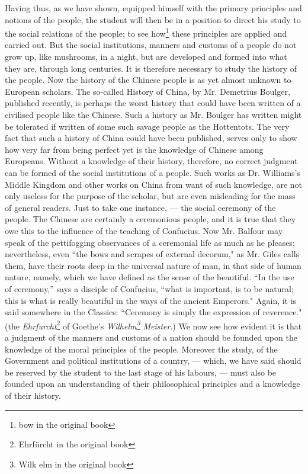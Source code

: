 Having thus, as we have shown, equipped himself with the primary principles and notions of the people, the student will then be in a position to direct his study to the social relations of the people; to see how\footnote{bow in the original book} these principles are applied and carried out. 
But the social institutions, manners and customs of a people do not grow up, like mushrooms, in a night, but are developed and formed into what they are, through long centuries.
It is therefore necessary to study the history of the people.
Now the history of the Chinese people is as yet almost unknown to European scholars.
The so-called History of China, by Mr. Demetrius Boulger, published recently, is perhaps the worst history that could have been written of a civilised people like the Chinese.
Such a history as Mr. Boulger has written might be tolerated if written of some such savage people as the Hottentots.
The very fact that such a history of China could have been published, serves only to show how very far from being perfect yet is the knowledge of Chinese among Europeans.
Without a knowledge of their history, therefore, no correct judgment can be formed of the social institutions of a people.
Such works as Dr. Williams's Middle Kingdom and other works on China from want of such knowledge, are not only useless for the purpose of the scholar, but are even misleading for the mass of general readers.
Just to take one instance, --- the social ceremony of the people.
The Chinese are certainly a ceremonious people, and it is true that they owe this to the influence of the teaching of Confucius.
Now Mr. Balfour may speak of the pettifogging observances of a ceremonial life as much as he pleases; nevertheless, even ``the bows and scrapes of external decorum," as Mr. Giles calls them, have their roots deep in the universal nature of man, in that side of human nature, namely, which we have defined as the sense of the beautiful.
``In the use of ceremony,'' says a disciple of Confucius, ``what is important, is to be natural; this is what is really beautiful in the ways of the ancient Emperors."
Again, it is said somewhere in the Classics: ``Ceremony is simply the expression of reverence." (the \emph{Ehrfurcht}\footnote{Ehrf\"urcht in the original book} of Goethe's \emph{Wilhelm\footnote{Wilk elm in the original book} Meister}.)
We now see how evident it is that a judgment of the manners and customs of a nation should be founded upon the knowledge of the moral principles of the people.
Moreover the study, of the Government and political institutions of a country, --- which, we have said should be reserved by the student to the last stage of his labours, --- must also be founded upon an understanding of their philosophical principles and a knowledge of their history.

